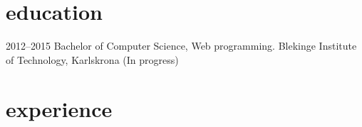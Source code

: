 \documentclass[]{friggeri-cv} %
\begin{document}
\section{education}

\begin{entrylist}
\entry
{2012--2015}
{Bachelor of Computer Science, Web programming.}
{Blekinge Institute of Technology, Karlskrona (In progress)}
{}
\end{entrylist}


\section{experience}
\end{document}
